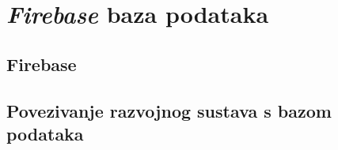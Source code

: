 \chapter{\textit{Firebase} baza podataka}

\section{Firebase}
\section{Povezivanje razvojnog sustava s bazom podataka}

\eject